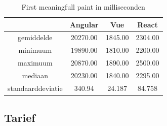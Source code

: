 \begin{table}[h]
	\centering
	\caption{First meaningfull paint in milliseconden}
	\label{table:first_meaningfull_paint}
	\begin{tabular}{|c|c|c|c|} \hline
									&Angular       &Vue        &React      \\ \hline
		gemiddelde			&20270.00     &1845.00  &2304.00 \\ \hline
		minimuum			&19890.00     &1810.00  &2200.00  \\ \hline
		maximuum			&20870.00    &1890.00  &2500.00 \\ \hline
		mediaan				   &20230.00    &1840.00  &2295.00 \\ \hline
		standaarddeviatie &340.94        &24.187    &84.758    \\ \hline
	\end{tabular}
\end{table}

\subsection{Tarief}
\label{sec:tarief}







